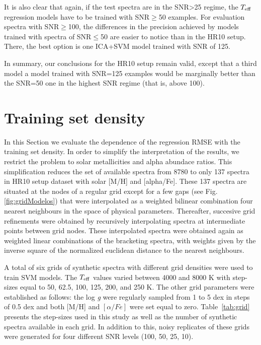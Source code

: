 \documentclass[a4paper,fleqn,usenatbib]{mnras}
\begin{document}
{{{It is also clear that again, if the test spectra 
are in the SNR>25 regime, the $T_{\rm eff}$ 
regression models have to be trained with SNR$\ge$50 examples.
For evaluation spectra with SNR$\ge$100, the differences 
in the precision achieved by models trained with spectra of 
SNR$\le$50 are easier to notice than in the HR10 setup. There, the best 
option is one ICA+SVM model trained with SNR of 125.

In summary, our conclusions for the HR10 setup remain valid, except 
that a third model a model trained with SNR=125 examples would be marginally 
better than the SNR=50 one in the highest SNR regime (that is, above 100). 

\section{Training set density}
\label{sec:comparison3}

In this Section we evaluate the dependence of the regression 
RMSE with the training set density. In order to simplify the 
interpretation of the results, we restrict the problem to solar 
metallicities and alpha abundace ratios. This simplification 
reduces the set of available spectra from 8780 to only 137 
spectra in HR10 setup dataset with solar [M/H] and [alpha/Fe]. 
These 137 spectra are situated at the nodes of a regular 
grid except for a few gaps (see Fig. \ref{fig:gridModelos}) 
that were interpolated as a weighted bilinear combination four 
nearest neighbours in the space of physical parameters. Thereafter, 
succesive grid refinements were obtained by recursively interpolating 
spectra at intermediate points between grid nodes. These interpolated 
spectra were obtained again as weighted linear combinations of the 
bracketing spectra, with weights given by the inverse square of 
the normalized euclidean distance to the nearest neighbours.

A total of six grids of synthetic spectra with different grid densities were used to
train SVM models. The $T_{\rm eff}$ values varied between 4000 and
8000 K with step-sizes equal to 50, 62.5, 100, 125, 200, and 250 K. The other
grid parameters were established as follows: the log \textit{g} were
regularly sampled from 1 to 5 dex in steps of 0.5 dex and both [M/H] and $\left[
\alpha/Fe \right]$ were set equal to zero. Table~\ref{tab:grid} presents 
the step-sizes used in this study as well as the number of synthetic spectra available in each
grid.  In addition to this, noisy replicates of these grids were
generated for four different SNR levels (100, 50, 25, 10).


}}}
\end{document}
